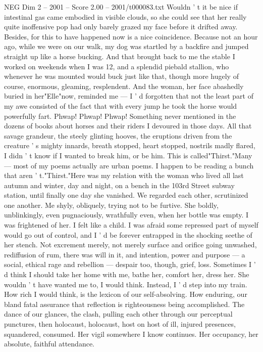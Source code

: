 \begin{textsample}{NEG Dim 2 – 2001 – Score 2.00 – 2001/t000083.txt}
Wouldn ' t it be nice if intestinal gas came embodied in visible clouds, so she could see that her really quite inoffensive pop had only barely grazed my face before it drifted away.
Besides, for this to have happened now is a nice coincidence.
Because not an hour ago, while we were on our walk, my dog was startled by a backfire and jumped straight up like a horse bucking.
And that brought back to me the stable I worked on weekends when I was 12, and a splendid piebald stallion, who whenever he was mounted would buck just like that, though more hugely of course, enormous, gleaming, resplendent.
And the woman, her face abashedly buried in her"Elle"now, reminded me — I ' d forgotten that not the least part of my awe consisted of the fact that with every jump he took the horse would powerfully fart.
Phwap!
Phwap!
Phwap!
Something never mentioned in the dozens of books about horses and their riders I devoured in those days.
All that savage grandeur, the steely glinting hooves, the eruptions driven from the creature ' s mighty innards, breath stopped, heart stopped, nostrils madly flared, I didn ' t know if I wanted to break him, or be him.
This is called"Thirst."Many — most of my poems actually are urban poems.
I happen to be reading a bunch that aren ' t."Thirst."Here was my relation with the woman who lived all last autumn and winter, day and night, on a bench in the 103rd Street subway station, until finally one day she vanished.
We regarded each other, scrutinized one another.
Me shyly, obliquely, trying not to be furtive.
She boldly, unblinkingly, even pugnaciously, wrathfully even, when her bottle was empty.
I was frightened of her.
I felt like a child.
I was afraid some repressed part of myself would go out of control, and I ' d be forever entrapped in the shocking seethe of her stench.
Not excrement merely, not merely surface and orifice going unwashed, rediffusion of rum, there was will in it, and intention, power and purpose — a social, ethical rage and rebellion — despair too, though, grief, loss.
Sometimes I ' d think I should take her home with me, bathe her, comfort her, dress her.
She wouldn ' t have wanted me to, I would think.
Instead, I ' d step into my train.
How rich I would think, is the lexicon of our self-absolving.
How enduring, our bland fatal assurance that reflection is righteousness being accomplished.
The dance of our glances, the clash, pulling each other through our perceptual punctures, then holocaust, holocaust, host on host of ill, injured presences, squandered, consumed.
Her vigil somewhere I know continues.
Her occupancy, her absolute, faithful attendance.

\end{textsample}

